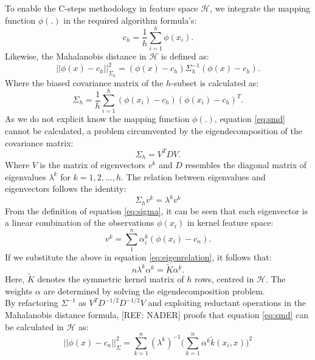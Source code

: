 \documentclass[preprint,12pt]{elsarticle}
\begin{document}
	To enable the C-steps methodology in feature space $\mathcal{H}$, we integrate the mapping function $\phi(.)$ in the required algorithm formula's: 
	\begin{equation}
	\label{eq:center}
	c_h = \frac{1}{h} \sum_{i=1}^{h}\phi(x_i).
	\end{equation}
	Likewise, the Mahalanobis distance in $\mathcal{H}$ is defined as:
	\begin{equation}
	\label{eq:smd}
	||\phi(x) - c_h||^2_{\Sigma_h} = (\phi(x) - c_h) \Sigma^{-1}_h (\phi(x) - c_h).
	\end{equation}
	Where the biased covariance matrix of the $h$-subset is calculated as:
	\begin{equation}
	\Sigma_h = \frac{1}{h} \sum_{i=1}^{h} (\phi(x_i) - c_h) (\phi(x_i) - c_h)^T.
	\label{eq:sigma}
	\end{equation}
	As we do not explicit know the mapping function $\phi(.)$, equation \eqref{eq:smd} cannot be calculated, a problem circumvented by the eigendecomposition of the covariance matrix:
	\begin{equation}
	\Sigma_h = V^T D V.
	\end{equation}
	Where $V$ is the matrix of eigenvectors $v^k$ and $D$ resembles the diagonal matrix of eigenvalues $\lambda^k$ for $k=1,2, \dots, h$. The relation between eigenvalues and eigenvectors follows the identity:
	\begin{equation}
	\label{eq:eigenrelation}
	\Sigma_h v^k = \lambda^k v^k
	\end{equation} 
	From the definition of equation \eqref{eq:sigma}, it can be seen that each eigenvector is a linear combination of the observations $\phi(x_i)$ in kernel feature space:
	\begin{equation}
	v^k = \sum_{1}^{n} \alpha_i^k ( \phi(x_i) - c_n). 
	\end{equation}
	If we substitute the above in equation \eqref{eq:eigenrelation}, it follows that:
	\begin{equation}
	n \lambda^k \alpha^k = \tilde{K} \alpha^k.
	\end{equation}
	Here, $\tilde{K}$ denotes the symmetric kernel matrix of $h$ rows, centred in $\mathcal{H}$. The weights $\alpha$ are determined by solving the eigendecomposition problem. \\
	By refactoring $\Sigma^{-1}$ as $V^T D^{-1/2} D^{-1/2} V$ and exploiting reductant operations in the Mahalanobis distance formula, [REF: NADER] proofs that equation \eqref{eq:smd} can be calculated in $\mathcal{H}$ as:
	\begin{equation}
	||\phi(x) - c_n||^2_{\Sigma} = \sum_{k=1}^{n} (\lambda^k)^{-1} \big( \sum_{k=1}^{n} \alpha^k \tilde{k}(x_i, x) \big)^2
	\end{equation}	
	
\end{document}
